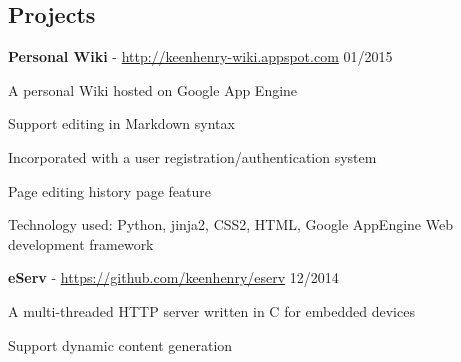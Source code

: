 \documentclass[margin,line]{resume}
\begin{document}
\begin{resume}
    \section{\mysidestyle Projects}


    \textbf{Personal Wiki} - \url{http://keenhenry-wiki.appspot.com} \hfill 01/2015 \vspace{-3mm}\\\vspace{-1mm}%
      \begin{list2}
       \item A personal Wiki hosted on Google App Engine
       \item Support editing in Markdown syntax
       \item Incorporated with a user registration/authentication system
       \item Page editing history page feature
       \item Technology used: Python, jinja2, CSS2, HTML, Google AppEngine Web development framework%
      \end{list2}

    \textbf{eServ} - \url{https://github.com/keenhenry/eserv} \hfill 12/2014 \vspace{-3mm}\\\vspace{-1mm}%
      \begin{list2}
       \item A multi-threaded HTTP server written in C for embedded devices
       \item Support dynamic content generation
      \end{list2}


\end{resume}
\end{document}
